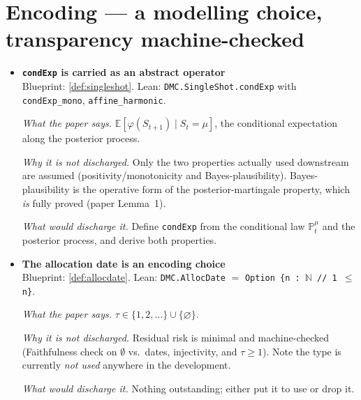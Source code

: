 \section*{Encoding --- a modelling choice, transparency machine-checked}
\begin{itemize}
  \item[] \textbf{\texttt{condExp} is carried as an abstract operator}\\
  Blueprint: \ref{def:singleshot}. Lean: \texttt{DMC.SingleShot.condExp} with \texttt{condExp\_mono}, \texttt{affine\_harmonic}.
  \par\smallskip\emph{What the paper says.} $\mathbb E[\varphi(S_{t+1})\mid S_t=\mu]$, the conditional expectation along the posterior process.
  \par\smallskip\emph{Why it is not discharged.} Only the two properties actually used downstream are assumed (positivity/monotonicity and Bayes-plausibility). Bayes-plausibility is the operative form of the posterior-martingale property, which \emph{is} fully proved (paper Lemma~1).
  \par\smallskip\emph{What would discharge it.} Define \texttt{condExp} from the conditional law $\mathbb P_t^\mu$ and the posterior process, and derive both properties.
\end{itemize}
\begin{itemize}
  \item[] \textbf{The allocation date is an encoding choice}\\
  Blueprint: \ref{def:allocdate}. Lean: \texttt{DMC.AllocDate} $=$ \texttt{Option \{n : $\mathbb N$ // 1 $\le$ n\}}.
  \par\smallskip\emph{What the paper says.} $\tau\in\{1,2,\dots\}\cup\{\varnothing\}$.
  \par\smallskip\emph{Why it is not discharged.} Residual risk is minimal and machine-checked (Faithfulness check on $\emptyset$ vs.\ dates, injectivity, and $\tau\ge1$). Note the type is currently \emph{not used} anywhere in the development.
  \par\smallskip\emph{What would discharge it.} Nothing outstanding; either put it to use or drop it.
\end{itemize}

